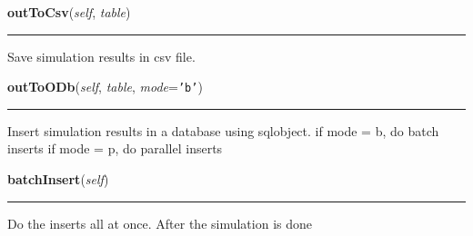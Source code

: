     \label{Epigrass:manager:simulate:outToCsv}

    \vspace{0.5ex}

    \begin{boxedminipage}{\textwidth}

    \raggedright \textbf{outToCsv}(\textit{self}, \textit{table})

    \vspace{-1.5ex}

    \rule{\textwidth}{0.5\fboxrule}
    Save simulation results in csv file.

    \vspace{1ex}

    \end{boxedminipage}

    \label{Epigrass:manager:simulate:outToODb}

    \vspace{0.5ex}

    \begin{boxedminipage}{\textwidth}

    \raggedright \textbf{outToODb}(\textit{self}, \textit{table}, \textit{mode}=\texttt{'b'})

    \vspace{-1.5ex}

    \rule{\textwidth}{0.5\fboxrule}
    Insert simulation results in a database using sqlobject. if mode = b, 
    do batch inserts if mode = p, do parallel inserts

    \vspace{1ex}

    \end{boxedminipage}

    \label{Epigrass:manager:simulate:batchInsert}

    \vspace{0.5ex}

    \begin{boxedminipage}{\textwidth}

    \raggedright \textbf{batchInsert}(\textit{self})

    \vspace{-1.5ex}

    \rule{\textwidth}{0.5\fboxrule}
    Do the inserts all at once. After the simulation is done

    \vspace{1ex}

    \end{boxedminipage}

